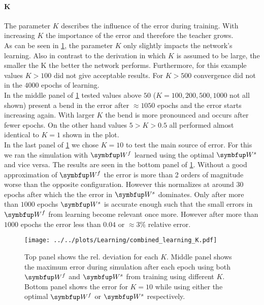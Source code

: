 \paragraph{K}
The parameter $K$ describes the influence of the error during training. With increasing $K$ the importance of the error and therefore the teacher grows.\\
As can be seen in \cref{fig:combined_learning_K}, the parameter $K$ only slightly impacts the network's learning. Also in contrast to the derivation in which $K$ is assumed to be large, the smaller the K the better the network performs. Furthermore, for this example values $K>100$ did not give acceptable results. For $K>500$ convergence did not in the $4000$ epochs of learning.\\
In the middle panel of \cref{fig:combined_learning_K} tested values above $50$ ($K = 100, 200,500,1000$ not all shown) present a bend in the error after $\approx 1050$ epochs and the error starts increasing again. With larger $K$ the bend is more pronounced and occurs after fewer epochs.
On the other hand values $5>K>0.5$ all performed almost identical to $K=1$ shown in the plot.\\
In the last panel of \cref{fig:combined_learning_K} we chose $K=10$ to test the main source of error. For this we ran the simulation with $\bmu{W}^f$ learned using the optimal $\bmu{W}^s$ and vice versa. The results are seen in the bottom panel of \cref{fig:combined_learning_K}. Without a good approximation of $\bmu{W}^f$ the error is more than 2 orders of magnitude worse than the opposite configuration. However this normalizes at around $30$ epochs after which the the error in $\bmu{W}^s$ dominates. Only after more than $1000$ epochs $\bmu{W}^s$ is accurate enough such that the small errors in $\bmu{W}^f$ from learning become relevant once more. However after more than $1000$ epochs the error less than $0.04$ or $\approx 3\%$ relative error.\\
\begin{figure}
	\centering
	\texttt{[image: ../../plots/Learning/combined\_learning\_K.pdf]}
	\caption{Top panel shows the rel. deviation for each $K$. Middle panel shows the maximum error during simulation after each epoch using both $\bmu{W}^f$ and $\bmu{W}^s$ from training using different $K$. Bottom panel shows the error for $K = 10$ while using either the optimal $\bmu{W}^f$ or $\bmu{W}^s$ respectively.}
	\label{fig:combined_learning_K}
\end{figure}

